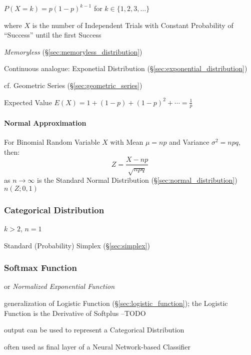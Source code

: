$P(X = k) = p(1-p)^{k-1}$ for $k \in \{1, 2, 3, \ldots\}$

where $X$ is the number of Independent Trials with Constant Probability of
``Success'' until the first Success

\emph{Memoryless} (\S\ref{sec:memoryless_distribution})

\fist Continuous analogue: Exponetial Distribution
(\S\ref{sec:exponential_distribution})

cf. Geometric Series (\S\ref{sec:geometric_series})

Expected Value $E(X) = 1 + (1-p) + (1-p)^2 + \cdots = \frac{1}{p}$



\paragraph{Normal Approximation}\label{sec:normal_approximation}\hfill

For Binomial Random Variable $X$ with Mean $\mu = np$ and Variance
$\sigma^2 = npq$, then:
\[
  Z = \frac{X - np}{\sqrt{npq}}
\]
as $n \to \infty$ is the Standard Normal Distribution
(\S\ref{sec:normal_distribution}) $n(Z;0,1)$



\subsubsection{Categorical Distribution}\label{sec:categorical_distribution}

$k > 2$, $n = 1$

Standard (Probability) Simplex (\S\ref{sec:simplex})



\subsubsection{Softmax Function}\label{sec:softmax}

or \emph{Normalized Exponential Function}

generalization of Logistic Function (\S\ref{sec:logistic_function}); the
Logistic Function is the Derivative of Softplus --TODO

output can be used to represent a Categorical Distribution

often used as final layer of a Neural Network-based Classifier



